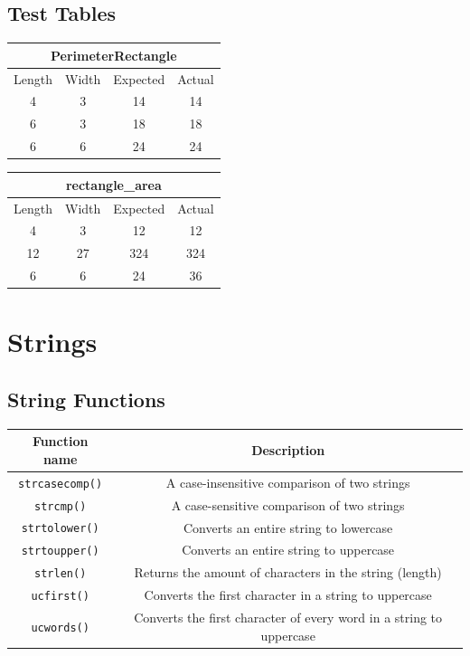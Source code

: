 \documentclass{article}
\begin{document}
        \subsection{Test Tables}
            \begin{tabular}{|c|c|c|c|}
                \hline
                \multicolumn{4}{|c|}{PerimeterRectangle} \\
                \hline
                Length & Width & Expected & Actual \\
                \hline
                4 & 3 & 14 & 14 \\
                \hline
                6&  3&  18& 18 \\
                \hline
                6&  6&  24& 24 \\
                \hline
            \end{tabular}
            \begin{tabular}{|c|c|c|c|}
                \hline
                \multicolumn{4}{|c|}{rectangle\_area} \\
                \hline
                Length & Width & Expected & Actual \\
                \hline
                4 & 3 & 12 & 12 \\
                \hline
                12 & 27 & 324 & 324 \\
                \hline
                6 & 6 & 24 & 36 \\
                \hline
            \end{tabular}
    \section{Strings}
        \subsection{String Functions}
            \begin{tabular}{|c|c|}
                \hline
                Function name & Description \\
                \hline
                \verb|strcasecomp()| & A case-insensitive comparison of two strings  \\
                \hline
                \verb|strcmp()| & A case-sensitive comparison of two strings \\
                \hline
                \verb|strtolower()| & Converts an entire string to lowercase \\
                \hline
                \verb|strtoupper()| & Converts an entire string to uppercase \\
                \hline
                \verb|strlen()| & Returns the amount of characters in the string (length) \\
                \hline
                \verb|ucfirst()| & Converts the first character in a string to uppercase \\
                \hline
                \verb|ucwords()| & Converts the first character of every word in a string to uppercase \\
                \hline
            \end{tabular}
\end{document}
